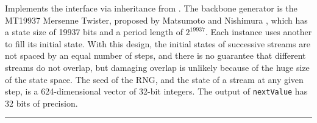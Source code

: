 
Implements the  interface via inheritance from
. The backbone generator is the MT19937
Mersenne Twister, proposed by Matsumoto and Nishimura
\cite{rMAT98a}, which has a state size of 19937 bits and a period length of
 \latex{$\rho\approx$} $2^{19937}$.
Each instance uses another  to fill its initial state.
With this design, the initial states of successive streams are not
spaced by an equal number of steps, and there is no guarantee that
different streams do not overlap, but damaging overlap is unlikely
because of the huge size of the state space.
The seed of the RNG, and the state of a stream at any given
step, is a 624-dimensional vector of 32-bit integers.
The output of \texttt{nextValue} has 32 bits of precision.

\bigskip\hrule

